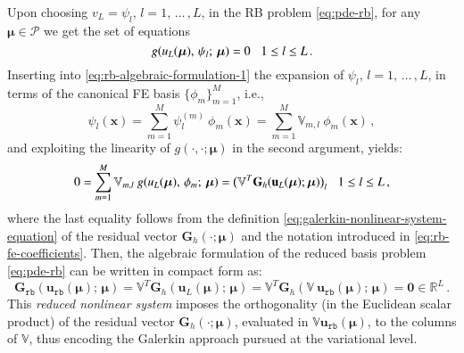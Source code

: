 \documentclass{elsarticle}
\theoremstyle{theorem}
\theoremstyle{definition}
\theoremstyle{remark}
\theoremstyle{proposition}
\numberwithin{figure}{section}
\newcommand{\bg}[1]{\boldsymbol{#1}}
\begin{document}
		Upon choosing $v_{L} = \psi_l$, $l = 1, \, \ldots \, , L$, in the RB problem \eqref{eq:pde-rb}, for any $\bg{\mu} \in \mathcal{P}$ we get the set of equations
		\begin{equation}
			\label{eq:rb-algebraic-formulation-1}
			g(u_{L}(\bg{\mu}), \, \psi_l; \, \bg{\mu}) = 0 \hspace*{0.3cm} 1 \leq l \leq L \, .
		\end{equation}
		Inserting into \eqref{eq:rb-algebraic-formulation-1} the expansion of $\psi_l$, $l = 1, \, \ldots \, , L$, in terms of the canonical FE basis $\big\lbrace \phi_m \big\rbrace_{m = 1}^M$, i.e.,
		\begin{equation*}
			\psi_l(\bg{x}) = \sum_{m = 1}^M \psi_l^{(m)} ~ \phi_m(\bg{x}) = \sum_{m = 1}^M \mathbb{V}_{m,l} ~ \phi_m(\bg{x}) \, ,
		\end{equation*} 
		and exploiting the linearity of $g(\cdot,\cdot; \bg{\mu})$ in the second argument, yields:
		\begin{equation*}
			0 = \sum_{m = 1}^M \mathbb{V}_{m,l} ~ g(u_L(\bg{\mu}), \, \phi_m; \, \bg{\mu}) = \big( \mathbb{V}^T \mathbf{G}_h(\mathbf{u}_L(\bg{\mu}); \bg{\mu}) \big)_l \hspace*{0.3cm} 1 \leq l \leq L \, ,
		\end{equation*}
		where the last equality follows from the definition \eqref{eq:galerkin-nonlinear-system-equation} of the residual vector $\mathbf{G}_h(\cdot; \bg{\mu})$ and the notation introduced in \eqref{eq:rb-fe-coefficients}. Then, the algebraic formulation of the reduced basis problem \eqref{eq:pde-rb} can be written in compact form as:
		\begin{equation}
			\label{eq:rb-nonlinear-system}
			\mathbf{G}_{\texttt{rb}}(\mathbf{u}_{\texttt{rb}}(\bg{\mu}); \, \bg{\mu}) = \mathbb{V}^T \mathbf{G}_h(\mathbf{u}_L(\bg{\mu}); \, \bg{\mu}) = \mathbb{V}^T \mathbf{G}_h(\mathbb{V} ~ \mathbf{u}_{\texttt{rb}}(\bg{\mu}); \, \bg{\mu}) = \bg{0} \in \mathbb{R}^L \, .
		\end{equation}
		This \emph{reduced nonlinear system} imposes the orthogonality (in the Euclidean scalar product) of the residual vector $\mathbf{G}_h(\cdot; \bg{\mu})$, evaluated in $\mathbb{V} \mathbf{u}_{\texttt{rb}}(\bg{\mu})$, to the columns of $\mathbb{V}$, thus encoding the Galerkin approach pursued at the variational level.
		
\end{document}
